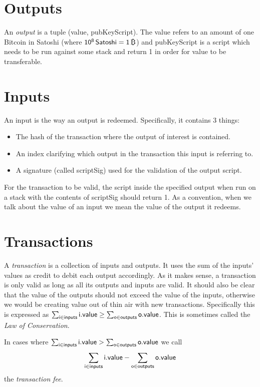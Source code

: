\section{Outputs} \label{sec:outputs}
An \emph{output} is a tuple ({\sf value, pubKeyScript}). The \textsf{value} refers to an amount of one Bitcoin in Satoshi (where $\sf 10^8 \, Satoshi = 1 \, \bitcoin$) and \textsf{pubKeyScript} is a script which needs to be run against some stack and return 1 in order for \textsf{value} to be transferable.

\section{Inputs} \label{sec:inputs}
An input is the way an output is redeemed. Specifically, it contains 3 things:
\begin{itemize}
  \item The hash of the transaction where the output of interest is contained.
  \item An index clarifying which output in the transaction this input is referring to.
  \item A signature (called \textsf{scriptSig}) used for the validation of the output script.
\end{itemize}

For the transaction to be valid, the script inside the specified output when run on a stack with the contents of \textsf{scriptSig} should return 1. As a convention, when we talk about the value of an input we mean the value of the output it redeems.
%

\section{Transactions} \label{sec:transactions}
A \emph{transaction} is a collection of inputs and outputs. It uses the sum of the inputs' values as credit to debit each output accordingly. As it makes sense, a transaction is only valid as long as all its outputs and inputs are valid. It should also be clear that the value of the outputs should not exceed the value of the inputs, otherwise we would be creating value out of thin air with new transactions. Specifically this is expressed as $\sum_{\sf i \in inputs} {\sf i.value} \ge \sum_{\sf o \in outputs} {\sf o.value}$. This is sometimes called the \emph{Law of Conservation}.

In cases where $\sum_{\sf i \in inputs} {\sf i.value} > \sum_{\sf o \in outputs} {\sf o.value}$ we call
\begin{equation}
  \sum_{\sf i \in inputs} {\sf i.value} - \sum_{\sf o \in outputs} {\sf o.value}
\end{equation}
the \emph{transaction fee}.

